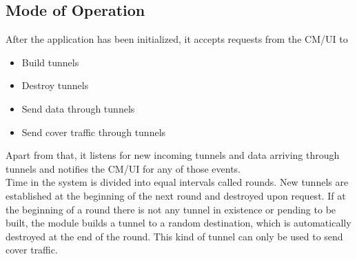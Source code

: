 \documentclass{article}
\begin{document}
	\subsection{Mode of Operation}
	After the application has been initialized, it accepts requests from the CM/UI to
	\begin{itemize}
		\item Build tunnels
		\item Destroy tunnels
		\item Send data through tunnels
		\item Send cover traffic through tunnels
	\end{itemize}
	Apart from that, it listens for new incoming tunnels and data arriving through tunnels and notifies the CM/UI for any of those events. \\
	Time in the system is divided into equal intervals called rounds. New tunnels are established at the beginning of the next round and destroyed upon request. If at the beginning of a round there is not any tunnel in existence or pending to be built, the module builds a tunnel to a random destination, which is automatically destroyed at the end of the round. This kind of tunnel can only be used to send cover traffic.
	
\end{document}
